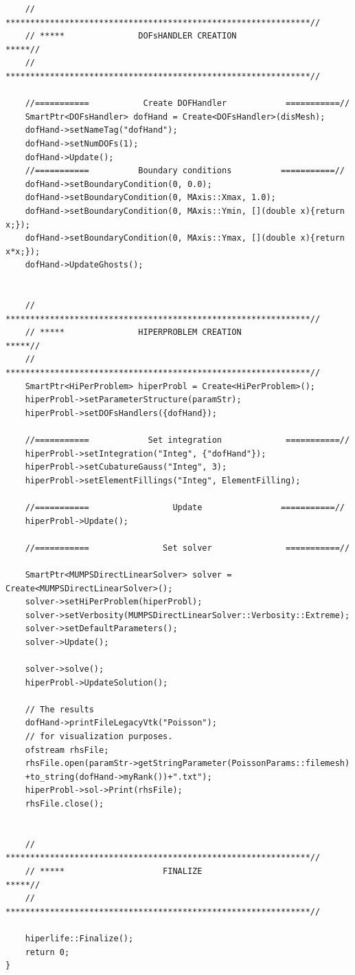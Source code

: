 \documentclass[]{article}
\begin{document}
\begin{lstlisting}
	// **************************************************************//
	// *****               DOFsHANDLER CREATION                 *****//
	// **************************************************************//
	
	//===========           Create DOFHandler            ===========//
	SmartPtr<DOFsHandler> dofHand = Create<DOFsHandler>(disMesh);
	dofHand->setNameTag("dofHand");
	dofHand->setNumDOFs(1);
	dofHand->Update();
	//===========          Boundary conditions          ===========//
	dofHand->setBoundaryCondition(0, 0.0);
	dofHand->setBoundaryCondition(0, MAxis::Xmax, 1.0);
	dofHand->setBoundaryCondition(0, MAxis::Ymin, [](double x){return x;});
	dofHand->setBoundaryCondition(0, MAxis::Ymax, [](double x){return x*x;});
	dofHand->UpdateGhosts();
	
	
	// **************************************************************//
	// *****               HIPERPROBLEM CREATION                *****//
	// **************************************************************//
	SmartPtr<HiPerProblem> hiperProbl = Create<HiPerProblem>();
	hiperProbl->setParameterStructure(paramStr);
	hiperProbl->setDOFsHandlers({dofHand});
	
	//===========            Set integration             ===========//
	hiperProbl->setIntegration("Integ", {"dofHand"});
	hiperProbl->setCubatureGauss("Integ", 3);
	hiperProbl->setElementFillings("Integ", ElementFilling);
	
	//===========                 Update                ===========//
	hiperProbl->Update();
	
	//===========               Set solver               ===========//
	
	SmartPtr<MUMPSDirectLinearSolver> solver = Create<MUMPSDirectLinearSolver>();
	solver->setHiPerProblem(hiperProbl);
	solver->setVerbosity(MUMPSDirectLinearSolver::Verbosity::Extreme);
	solver->setDefaultParameters();
	solver->Update();
	
	solver->solve();
	hiperProbl->UpdateSolution();
	
	// The results
	dofHand->printFileLegacyVtk("Poisson");
	// for visualization purposes.
	ofstream rhsFile;
	rhsFile.open(paramStr->getStringParameter(PoissonParams::filemesh)
	+to_string(dofHand->myRank())+".txt");
	hiperProbl->sol->Print(rhsFile);
	rhsFile.close();
	
	
	// **************************************************************//
	// *****                    FINALIZE                        *****//
	// **************************************************************//
	
	hiperlife::Finalize();
	return 0;
}

\end{lstlisting}
\end{document}
